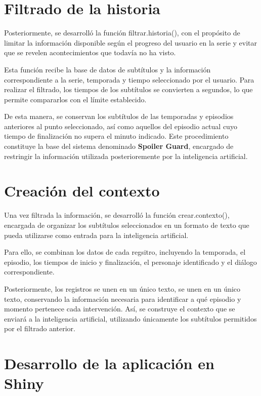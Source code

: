 \documentclass[
  spanish,
  12pt,
  letterpaper,
]{article}
\begin{document}
\section{Filtrado de la historia}\label{filtrado-de-la-historia}

Posteriormente, se desarrolló la función filtrar.historia(), con el
propósito de limitar la información disponible según el progreso del
usuario en la serie y evitar que se revelen acontecimientos que todavía
no ha visto.

Esta función recibe la base de datos de subtítulos y la información
correspondiente a la serie, temporada y tiempo seleccionado por el
usuario. Para realizar el filtrado, los tiempos de los subtítulos se
convierten a segundos, lo que permite compararlos con el límite
establecido.

De esta manera, se conservan los subtítulos de las temporadas y
episodios anteriores al punto seleccionado, así como aquellos del
episodio actual cuyo tiempo de finalización no supera el minuto
indicado. Este procedimiento constituye la base del sistema denominado
\textbf{Spoiler Guard}, encargado de restringir la información utilizada
posterioremente por la inteligencia artificial.

\section{Creación del contexto}\label{creaciuxf3n-del-contexto}

Una vez filtrada la información, se desarrolló la función
crear.contexto(), encargada de organizar los subtítulos seleccionados en
un formato de texto que pueda utilizarse como entrada para la
inteligencia artificial.

Para ello, se combinan los datos de cada regsitro, incluyendo la
temporada, el episodio, los tiempos de inicio y finalización, el
personaje identificado y el diálogo correspondiente.

Posteriormente, los registros se unen en un único texto, se unen en un
único texto, conservando la información necesaria para identificar a qué
episodio y momento pertenece cada intervención. Así, se construye el
contexto que se enviará a la inteligencia artificial, utilizando
únicamente los subtítulos permitidos por el filtrado anterior.

\section{Desarrollo de la aplicación en
Shiny}\label{desarrollo-de-la-aplicaciuxf3n-en-shiny}
\end{document}
